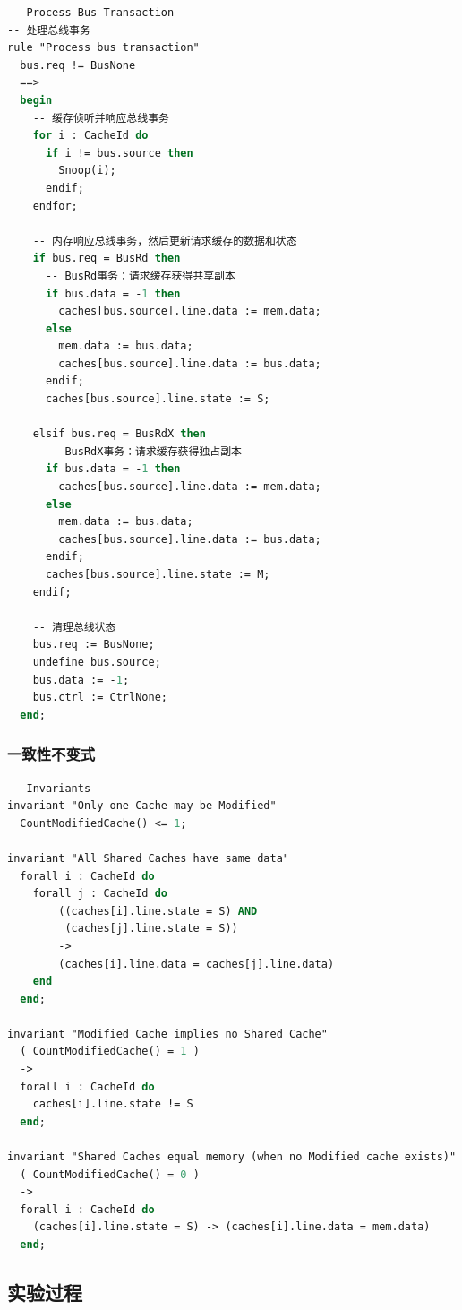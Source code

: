 \documentclass[a4paper]{article}
\begin{document}
\begin{lstlisting}[language=pascal]
-- Process Bus Transaction
-- 处理总线事务
rule "Process bus transaction"
  bus.req != BusNone
  ==>
  begin
    -- 缓存侦听并响应总线事务
    for i : CacheId do
      if i != bus.source then
        Snoop(i);
      endif;
    endfor;

    -- 内存响应总线事务，然后更新请求缓存的数据和状态
    if bus.req = BusRd then
      -- BusRd事务：请求缓存获得共享副本
      if bus.data = -1 then
        caches[bus.source].line.data := mem.data;
      else
        mem.data := bus.data;
        caches[bus.source].line.data := bus.data;
      endif;
      caches[bus.source].line.state := S;
      
    elsif bus.req = BusRdX then
      -- BusRdX事务：请求缓存获得独占副本
      if bus.data = -1 then
        caches[bus.source].line.data := mem.data;
      else
        mem.data := bus.data;
        caches[bus.source].line.data := bus.data;
      endif;
      caches[bus.source].line.state := M;
    endif;

    -- 清理总线状态
    bus.req := BusNone;
    undefine bus.source;
    bus.data := -1;
    bus.ctrl := CtrlNone;
  end;
\end{lstlisting}

\subsubsection{一致性不变式}

\begin{lstlisting}[language=pascal]
-- Invariants
invariant "Only one Cache may be Modified"
  CountModifiedCache() <= 1;

invariant "All Shared Caches have same data"
  forall i : CacheId do
    forall j : CacheId do
        ((caches[i].line.state = S) AND
         (caches[j].line.state = S))
        ->
        (caches[i].line.data = caches[j].line.data)
    end
  end;

invariant "Modified Cache implies no Shared Cache"
  ( CountModifiedCache() = 1 )
  ->
  forall i : CacheId do
    caches[i].line.state != S
  end;

invariant "Shared Caches equal memory (when no Modified cache exists)"
  ( CountModifiedCache() = 0 )
  -> 
  forall i : CacheId do
    (caches[i].line.state = S) -> (caches[i].line.data = mem.data)
  end;
\end{lstlisting}

\subsection{实验过程}
\end{document}
